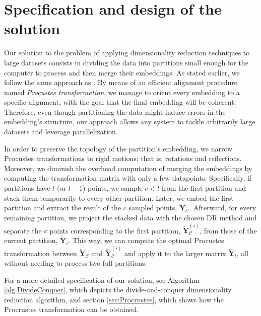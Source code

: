 \section{Specification and design of the solution}
\label{sec:specification-and-design-of-the-solution}

Our solution to the problem of applying dimensionality reduction techniques to large datasets consists in dividing the data into partitions small enough for the computer to process and then merge their embeddings. As stated earlier, we follow the same approach as \citet{Delicado2024}. By means of an efficient alignment procedure named \textit{Procustes transformation}, we manage to orient every embedding to a specific alignment, with the goal that the final embedding will be coherent. Therefore, even though partitioning the data might induce errors in the embedding's structure, our approach allows any system to tackle arbitrarily large datasets and leverage parallelization.

In order to preserve the topology of the partition's embedding, we narrow Procustes transformations to rigid motions; that is, rotations and reflections. Moreover, we diminish the overhead computation of merging the embeddings by computing the transformation matrix with only a few datapoints. Specifically, if partitions have $l$ (or $l-1$) points, we sample $c < l$ from the first partition and stack them temporarily to every other partition. Later, we embed the first partition and extract the result of the $c$ sampled points, $\mathbf{\tilde{Y}}_{\mathcal{C}}$. Afterward, for every remaining partition, we project the stacked data with the chosen DR method and separate the $c$ points corresponding to the first partition, $\mathbf{\tilde{Y}}_{\mathcal{C}}^{(i)}$, from those of the current partition, $\mathbf{\tilde{Y}}_{i}$. This way, we can compute the optimal Procustes transformation between $\mathbf{\tilde{Y}}_{\mathcal{C}}$ and $\mathbf{\tilde{Y}}_{\mathcal{C}}^{(i)}$ and apply it to the larger matrix $\mathbf{\tilde{Y}}_i$, all without needing to process two full partitions.

For a more detailed specification of our solution, see Algorithm \ref{alg:DivideConquer}, which depicts the divide-and-conquer dimensionality reduction algorithm, and section \ref{sec:Procrustes}, which shows how the Procrustes transformation can be obtained.

